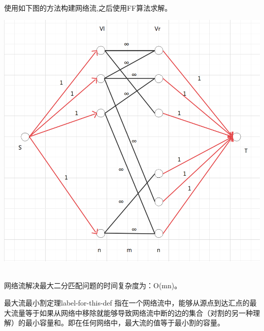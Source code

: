\\使用如下图的方法构建网络流,之后使用FF算法求解。\\
\centerline{\includegraphics[scale=0.4]{image/networkflow2.png}}
\\网络流解决最大二分匹配问题的时间复杂度为：O(mn)。

\begin{lemma}{最大流最小割定理}{label-for-this-def}
    指在一个网络流中，能够从源点到达汇点的最大流量等于如果从网络中移除就能够导致网络流中断的边的集合（对割的另一种理解）的最小容量和。即在任何网络中，最大流的值等于最小割的容量。
\end{lemma}

